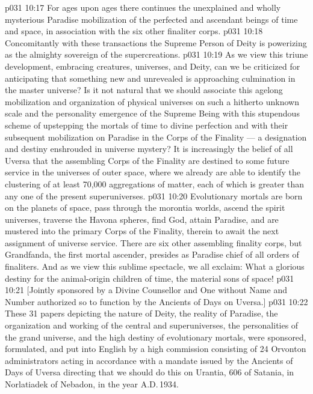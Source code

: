 \vs p031 10:17 \bibnobreakspace For ages upon ages there continues the unexplained and wholly mysterious Paradise mobilization of the perfected and ascendant beings of time and space, in association with the six other finaliter corps.
\vs p031 10:18 \bibnobreakspace Concomitantly with these transactions the Supreme Person of Deity is powerizing as the almighty sovereign of the supercreations.
\vs p031 10:19 \pc As we view this triune development, embracing creatures, universes, and Deity, can we be criticized for anticipating that something new and unrevealed is approaching culmination in the master universe? Is it not natural that we should associate this agelong mobilization and organization of physical universes on such a hitherto unknown scale and the personality emergence of the Supreme Being with this stupendous scheme of upstepping the mortals of time to divine perfection and with their subsequent mobilization on Paradise in the Corps of the Finality --- a designation and destiny enshrouded in universe mystery? It is increasingly the belief of all Uversa that the assembling Corps of the Finality are destined to some future service in the universes of outer space, where we already are able to identify the clustering of at least 70,000 aggregations of matter, each of which is greater than any one of the present superuniverses.
\vs p031 10:20 \pc Evolutionary mortals are born on the planets of space, pass through the morontia worlds, ascend the spirit universes, traverse the Havona spheres, find God, attain Paradise, and are mustered into the primary Corps of the Finality, therein to await the next assignment of universe service. There are six other assembling finality corps, but Grandfanda, the first mortal ascender, presides as Paradise chief of all orders of finaliters. And as we view this sublime spectacle, we all exclaim: What a glorious destiny for the animal\hyp{}origin children of time, the material sons of space!
\vsetoff
\vs p031 10:21 [Jointly sponsored by a Divine Counsellor and One without Name and Number authorized so to function by the Ancients of Days on Uversa.]
\separatorline
\vs p031 10:22 These 31 papers depicting the nature of Deity, the reality of Paradise, the organization and working of the central and superuniverses, the personalities of the grand universe, and the high destiny of evolutionary mortals, were sponsored, formulated, and put into English by a high commission consisting of 24 Orvonton administrators acting in accordance with a mandate issued by the Ancients of Days of Uversa directing that we should do this on Urantia, 606 of Satania, in Norlatiadek of Nebadon, in the year A.D.\,1934.
\quizlink
